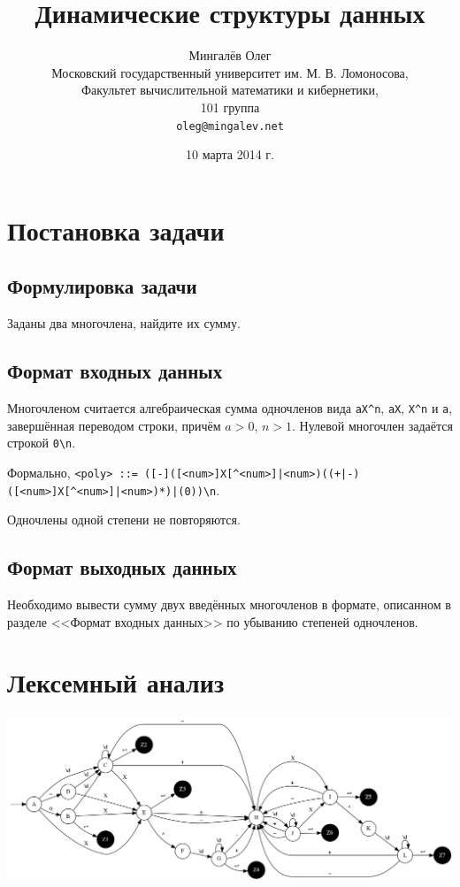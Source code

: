 \documentclass{report}
\author{{\huge Мингалёв Олег}\\
Московский государственный университет им. М. В. Ломоносова,\\
Факультет вычислительной математики и кибернетики,\\
101 группа\\
\texttt{oleg@mingalev.net}}
\title{Динамические структуры данных}
\date{10 марта 2014 г.}
\begin{document}
\maketitle
\tableofcontents
\chapter{Постановка задачи}
\section{Формулировка задачи}

Заданы два многочлена, найдите их сумму.

\section{Формат входных данных}

Многочленом считается алгебраическая сумма одночленов вида \texttt{aX\^{}n}, \texttt{aX}, \texttt{X\^{}n} и \texttt{a}, завершённая переводом строки, причём $ a > 0 $, $ n > 1 $. Нулевой многочлен задаётся строкой \texttt{0\textbackslash{}n}.

Формально, \texttt{<poly> ::= ([-]([<num>]X[\^{}<num>]|<num>)((+|-)([<num>]X[\^{}<num>]|<num>)*)|(0))\textbackslash{}n}.

Одночлены одной степени не повторяются.

\section{Формат выходных данных}

Необходимо вывести сумму двух введённых многочленов в формате, описанном в разделе <<Формат входных данных>> по убыванию степеней одночленов.


\chapter{Лексемный анализ}

\includegraphics[width=\linewidth]{graph.png}
\end{document}
